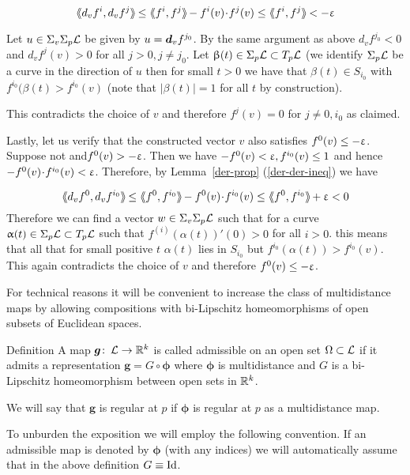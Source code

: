 \[
\dlang d_vf^i,d_vf^j\drang\le \dlang f^i, f^j\drang-f^i(v)\cdot f^j(v)\le \dlang f^i, f^j\drang<-\eps
\]


Let $u\in \Sigma_v\Sigma_p\spc{L}$ be given by $u= \bm{d}_vf^{j_0}$. By the same argument as above  $d_vf^{j_0}<0$ and $d_vf^j(v)>0$ for all $j>0,j\ne j_0$.  Let $\beta(t)\in \Sigma_p\spc{L}\subset T_p\spc{L}$ (we identify $ \Sigma_p\mathcal{L}$ be a curve in the direction of $u$ then for small $t>0$ we have that 
 $\beta(t)\in S_{i_0}$ with $f^{i_0}(\beta(t)>f^{i_0}(v)$
(note that $|\beta(t)|=1$ for all $t$ by construction).
 
  This contradicts the choice of $v$ and therefore $f^j(v)=0$ for $j\ne 0,i_0$ as claimed.
  
  Lastly, let us verify that the constructed vector $v$ also satisfies $f^{0}(v)\le -\eps$. Suppose not  and$ f^{0}(v)> -\upvarepsilon$. Then  we have $-f^0(v)<\eps, f^{i_0}(v)\le 1$ and hence 
  $-f^0(v)\cdot f^{i_0}(v)< \eps$.  Therefore, by Lemma~\ref{der-prop} (\ref{der-der-ineq}) we have
  
  \[
  \dlang d_vf^0,d_vf^{i_0}\drang\le  \dlang f^0, f^{i_0}\drang-f^0(v)\cdot f^{i_0}(v)\le \dlang f^0, f^{i_0}\drang+\eps<0
  \]
  Therefore we can find a vector $w\in \Sigma_v\Sigma_p\spc{L}$ such that for a curve $\alpha(t)\in \Sigma_p\spc{L}\subset T_p\spc{L}$ such that $f^(i)(\alpha(t))'(0)>0$ for all $i>0$. this means that all that for small positive $t$ $\alpha(t)$ lies in $S_{i_0}$ but $f^{i_0}(\alpha(t))>f^{i_0}(v)$. This  again contradicts the choice of $v$ and therefore $f^{0}(v)\le -\eps$.
\qeds



For technical reasons it will be convenient to increase the class of multidistance maps by allowing compositions with bi-Lipschitz homeomorphisms  of open subsets of  Euclidean spaces.

\begin{thm}{Definition}
A map $\bm g\co \spc{L}\to\RR^k$ is called admissible on an open set $\Omega\subset {\spc{L}}$ if it admits a representation $\bm g=G\circ \bm\phi$ where $\bm\phi$ is multidistance and $G$ is a bi-Lipschitz homeomorphism between open sets in $\mathbb{R}^k$.

We will say that $\bm g$ is regular at $p$ if $\bm\phi$ is regular   at $p$ as a  multidistance map.
\end{thm}



To unburden the exposition we will employ the following convention.
If an admissible map is denoted by $\bm\phi$ (with any indices) we will automatically assume that in the above definition $G\equiv \mathop{\rm Id}\nolimits$.


